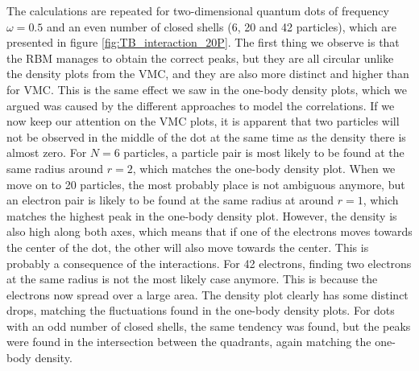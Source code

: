 The calculations are repeated for two-dimensional quantum dots of frequency $\omega=0.5$ and an even number of closed shells (6, 20 and 42 particles), which are presented in figure \eqref{fig:TB_interaction_20P}. The first thing we observe is that the RBM manages to obtain the correct peaks, but they are all circular unlike the density plots from the VMC, and they are also more distinct and higher than for VMC. This is the same effect we saw in the one-body density plots, which we argued was caused by the different approaches to model the correlations. If we now keep our attention on the VMC plots, it is apparent that two particles will not be observed in the middle of the dot at the same time as the density there is almost zero. For $N=6$ particles, a particle pair is most likely to be found at the same radius around $r=2$, which matches the one-body density plot. When we move on to 20 particles, the most probably place is not ambiguous anymore, but an electron pair is likely to be found at the same radius at around $r=1$, which matches the highest peak in the one-body density plot. However, the density is also high along both axes, which means that if one of the electrons moves towards the center of the dot, the other will also move towards the center. This is probably a consequence of the interactions. For 42 electrons, finding two electrons at the same radius is not the most likely case anymore. This is because the electrons now spread over a large area. The density plot clearly has some distinct drops, matching the fluctuations found in the one-body density plots. For dots with an odd number of closed shells, the same tendency was found, but the peaks were found in the intersection between the quadrants, again matching the one-body density. 

